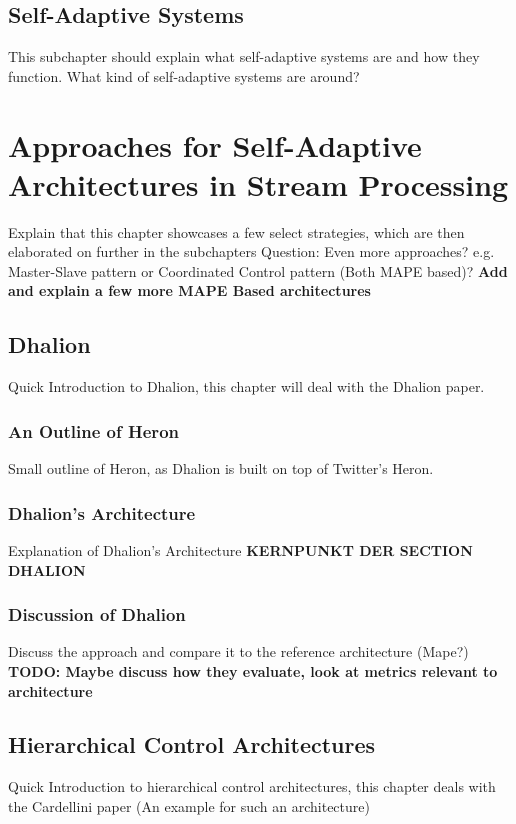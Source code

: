     
    \section{Self-Adaptive Systems}
    This subchapter should explain what self-adaptive systems are and how they function.
    What kind of self-adaptive systems are around?
    



\chapter{Approaches for Self-Adaptive Architectures in Stream Processing}
Explain that this chapter showcases a few select strategies, which are then elaborated on further in the subchapters
Question: Even more approaches? e.g. Master-Slave pattern or Coordinated Control pattern (Both MAPE based)?
\textbf{Add and explain a few more MAPE Based architectures}

    \section{Dhalion}
    Quick Introduction to Dhalion, this chapter will deal with the Dhalion paper.

        \subsection{An Outline of Heron}
        Small outline of Heron, as Dhalion is built on top of Twitter's Heron.

        \subsection{Dhalion's Architecture}
        Explanation of Dhalion's Architecture \textbf{KERNPUNKT DER SECTION DHALION}

        \subsection{Discussion of Dhalion}
        Discuss the approach and compare it to the reference architecture (Mape?)
        \textbf{TODO: Maybe discuss how they evaluate, look at metrics relevant to architecture}

    \section{Hierarchical Control Architectures}
    Quick Introduction to hierarchical control architectures, this chapter deals with the Cardellini
    paper (An example for such an architecture)

